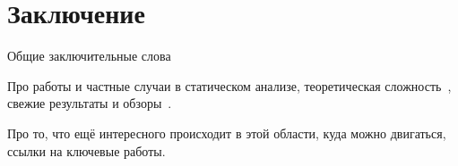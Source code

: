 ﻿\chapter{Заключение}

Общие заключительные слова

Про работы и частные случаи в статическом анализе, теоретическая сложность~\cite{10.1145/3571252, istomina2023finegrained}, свежие результаты и обзоры~\cite{10.1145/3583660.3583664}.

Про то, что ещё интересного происходит в этой области, куда можно двигаться, ссылки на ключевые работы.
